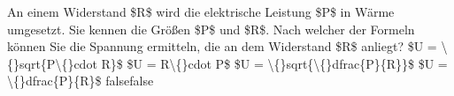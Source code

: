     {An einem Widerstand \$R\$ wird die elektrische Leistung \$P\$ in Wärme umgesetzt. Sie kennen die Größen \$P\$ und \$R\$. Nach welcher der Formeln können Sie die Spannung ermitteln, die an dem Widerstand \$R\$ anliegt?}
    {\$U = \textbackslash\{\}sqrt\{P\textbackslash\{\}cdot R\}\$}
    {\$U = R\textbackslash\{\}cdot P\$}
    {\$U = \textbackslash\{\}sqrt\{\textbackslash\{\}dfrac\{P\}\{R\}\}\$}
    {\$U = \textbackslash\{\}dfrac\{P\}\{R\}\$}
    {false}{false}